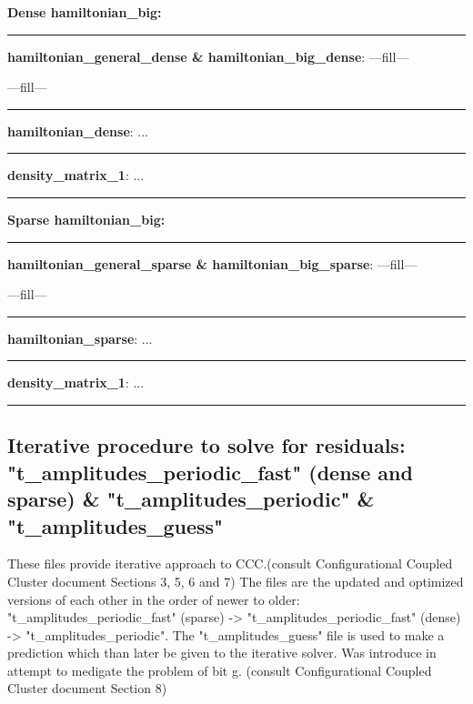\documentclass[a4paper,10pt]{article}
\begin{document}
\textbf{\newline Dense hamiltonian\_big:}

\noindent\rule{\linewidth}{0.4pt}

\textbf{hamiltonian\_general\_dense \& hamiltonian\_big\_dense}: ---fill---

---fill---

\noindent\rule{\linewidth}{0.4pt}

\textbf{hamiltonian\_dense}: ...

\noindent\rule{\linewidth}{0.4pt}

\textbf{density\_matrix\_1}: ...

\noindent\rule{\linewidth}{0.4pt}



\textbf{\newline Sparse hamiltonian\_big:}

\noindent\rule{\linewidth}{0.4pt}

\textbf{hamiltonian\_general\_sparse \& hamiltonian\_big\_sparse}: ---fill---

---fill---

\noindent\rule{\linewidth}{0.4pt}

\textbf{hamiltonian\_sparse}: ...

\noindent\rule{\linewidth}{0.4pt}

\textbf{density\_matrix\_1}: ...

\noindent\rule{\linewidth}{0.4pt}




\subsection{Iterative procedure to solve for residuals: "t\_amplitudes\_periodic\_fast" (dense and sparse) \&
"t\_amplitudes\_periodic" \& "t\_amplitudes\_guess"}

These files provide iterative approach to CCC.(consult Configurational Coupled Cluster document Sections 3, 5, 6 and 7) The files are
the updated and optimized versions of each other in the order of newer to older: "t\_amplitudes\_periodic\_fast" (sparse) -> "t\_amplitudes\_periodic\_fast" (dense) -> "t\_amplitudes\_periodic".
\newline \newline
The "t\_amplitudes\_guess" file is used to make a prediction which than later be given to the iterative solver. Was introduce in attempt to
medigate the problem of bit g. (consult Configurational Coupled Cluster document Section 8)
\end{document}
